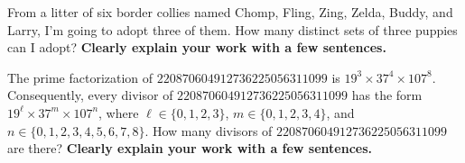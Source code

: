 \documentclass[12pt,fleqn,answers]{exam}
\begin{document}
\begin{questions}
     \question [2] From a litter of six border collies named Chomp,
     Fling, Zing, Zelda, Buddy, and Larry, I'm going to adopt three of them. How many distinct sets of
     three puppies can I adopt?  
     \textbf{Clearly explain your work with a few sentences.}

     \begin{solution}

     \end{solution}
     \question [2] The prime factorization of $220870604912736225056311099$ is
     ${{19}^{3}} \times  {{37}^{4}} \times {{107}^{8}}$. Consequently, every divisor of $220870604912736225056311099$
     has the form $19^\ell \times 37^m \times 107^n$, where $\ell \in \{0,1,2,3\}$,
     $m \in \{0,1,2,3,4\}$, and $n \in \{0,1,2,3,4,5,6,7,8\}$. How many divisors of 
     $220870604912736225056311099$ are there? \textbf{Clearly explain your work with a few sentences.}

     \begin{solution}

     \end{solution}

\end{questions}
\end{document}
